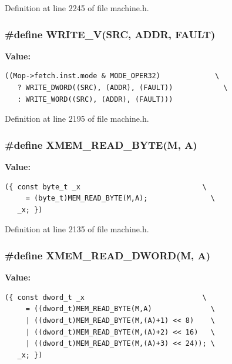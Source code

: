Definition at line 2245 of file machine.h.
\subsubsection[{WRITE\_\-V}]{\setlength{\rightskip}{0pt plus 5cm}\#define WRITE\_\-V(SRC, \/  ADDR, \/  FAULT)}\label{machine_8h_a2f7e2483f8ecb6e88238e93044acf09}


\textbf{Value:}

\begin{Code}\begin{verbatim}((Mop->fetch.inst.mode & MODE_OPER32)             \
   ? WRITE_DWORD((SRC), (ADDR), (FAULT))            \
   : WRITE_WORD((SRC), (ADDR), (FAULT)))
\end{verbatim}
\end{Code}


Definition at line 2195 of file machine.h.
\subsubsection[{XMEM\_\-READ\_\-BYTE}]{\setlength{\rightskip}{0pt plus 5cm}\#define XMEM\_\-READ\_\-BYTE(M, \/  A)}\label{machine_8h_677838daadb2b42f0fed57a0743c767a}


\textbf{Value:}

\begin{Code}\begin{verbatim}({ const byte_t _x                             \
     = (byte_t)MEM_READ_BYTE(M,A);               \
   _x; })
\end{verbatim}
\end{Code}


Definition at line 2135 of file machine.h.
\subsubsection[{XMEM\_\-READ\_\-DWORD}]{\setlength{\rightskip}{0pt plus 5cm}\#define XMEM\_\-READ\_\-DWORD(M, \/  A)}\label{machine_8h_34a48e322b5ec8edf7689a4d20ffa4b4}


\textbf{Value:}

\begin{Code}\begin{verbatim}({ const dword_t _x                            \
     = ((dword_t)MEM_READ_BYTE(M,A)              \
     | ((dword_t)MEM_READ_BYTE(M,(A)+1) << 8)    \
     | ((dword_t)MEM_READ_BYTE(M,(A)+2) << 16)   \
     | ((dword_t)MEM_READ_BYTE(M,(A)+3) << 24)); \
   _x; })
\end{verbatim}
\end{Code}


